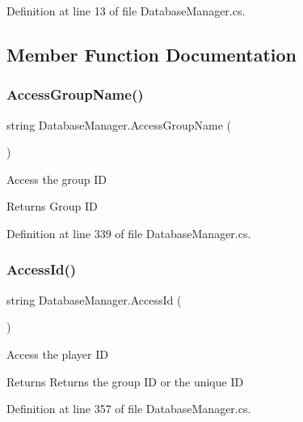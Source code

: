 Definition at line 13 of file Database\+Manager.\+cs.



\subsection{Member Function Documentation}
\mbox{\label{class_database_manager_a3ecc1e7d30ba7c71922588dd7a03c8cb}} 
\subsubsection{\texorpdfstring{Access\+Group\+Name()}{AccessGroupName()}}
{\footnotesize\ttfamily string Database\+Manager.\+Access\+Group\+Name (\begin{DoxyParamCaption}{ }\end{DoxyParamCaption})}



Access the group ID 

\begin{DoxyReturn}{Returns}
Group ID
\end{DoxyReturn}


Definition at line 339 of file Database\+Manager.\+cs.

\mbox{\label{class_database_manager_a59fd27d4114804a39d197da3b95fa2de}} 
\subsubsection{\texorpdfstring{Access\+Id()}{AccessId()}}
{\footnotesize\ttfamily string Database\+Manager.\+Access\+Id (\begin{DoxyParamCaption}{ }\end{DoxyParamCaption})}



Access the player ID 

\begin{DoxyReturn}{Returns}
Returns the group ID or the unique ID
\end{DoxyReturn}


Definition at line 357 of file Database\+Manager.\+cs.

